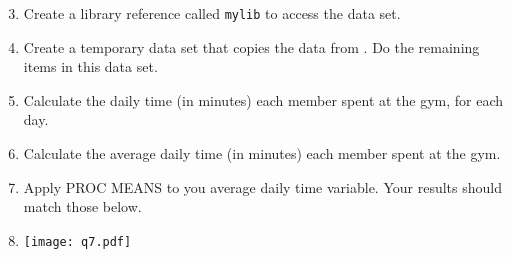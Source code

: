 \begin{enumerate}
\setcounter{enumi}{2}
\item Create a library reference called \texttt{mylib} to access the  data set.
\item Create a temporary data set that copies the data from .  Do the remaining items in this data set.
\item Calculate the daily time (in minutes) each member spent at the gym, for each day.
\item Calculate the average daily time (in minutes) each member spent at the gym.
\item Apply PROC MEANS to you average daily time variable.  Your results should match those below.
\item[] \texttt{[image: q7.pdf]}
\end{enumerate}
 